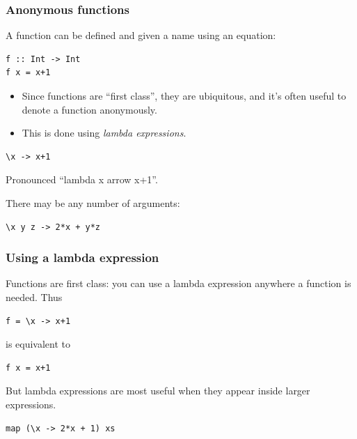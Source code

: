 \documentclass{beamer}
\begin{document}
\begin{frame}[fragile]
\frametitle{Anonymous functions}

A function can be defined and given a name using an equation:

\begin{verbatim}
f :: Int -> Int
f x = x+1
\end{verbatim}

\begin{itemize}
\item Since functions are ``first class'', they are ubiquitous, and
  it's often useful to denote a function anonymously.
\item This is done using \emph{lambda expressions}.
\end{itemize}

\begin{verbatim}
\x -> x+1
\end{verbatim}

Pronounced ``lambda x arrow x+1''.

There may be any number of arguments:

\begin{verbatim}
\x y z -> 2*x + y*z
\end{verbatim}

\end{frame}

\begin{frame}[fragile]
\frametitle{Using a lambda expression}

Functions are first class: you can use a lambda expression anywhere
a function is needed.  Thus

\begin{verbatim}
f = \x -> x+1
\end{verbatim}

is equivalent to

\begin{verbatim}
f x = x+1
\end{verbatim}

But lambda expressions are most useful when they appear inside
larger expressions.

\begin{verbatim}
map (\x -> 2*x + 1) xs
\end{verbatim}

\end{frame}
\end{document}
